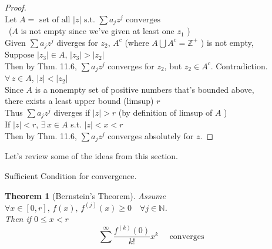 \documentclass[twoside]{amsart}
\theoremstyle{plain}
\newtheorem{theorem}{Theorem}
\theoremstyle{definition}
\begin{document}
\begin{proof} \quad \\
Let $A = \text{ set of all $|z|$ s.t. $\sum a_j z^j$ converges } $ \\
\quad \, ($A$ is not empty since we've given at least one $z_1$ ) \bigskip \\

Given $\sum a_j z^j$ diverges for $z_2$, $A^c$ (where $A \bigcup A^c = \mathbb{Z}^+$ ) is not empty, \medskip \\
\phantom{ Give} Suppose $|z_3| \in A$, \quad $|z_3| > |z_2|$ \\
\phantom{ Given Sup} Then by Thm. 11.6, $\sum a_j z^j$ converges for $z_2$, but $z_2 \in A^c$.  Contradiction.  \medskip \\
  \phantom{ Given Suppose } $\forall \, z \in A$, $|z| < |z_2|$ \bigskip \\

Since $A$ is a nonempty set of positive numbers that's bounded above, \\
\phantom{Sinc} there exists a least upper bound (limsup) $r$ \medskip \\
\phantom{Since th} Thus $\sum a_j z^j$ diverges if $|z| > r$ (by definition of limsup of $A$ ) \bigskip \\

If $|z| < r$, $\exists \, x \in A$ s.t. $|z| < x < r$ \medskip \\
\phantom{ If } Then by Thm. 11.6, $\sum a_j z^j$ converges absolutely for $z$.  
\end{proof}

Let's review some of the ideas from this section.  

Sufficient Condition for convergence.  
\begin{theorem}[Bernstein's Theorem]
Assume $\forall x \in [0,r], \, f(x), \, f^{(j)}(x) \geq 0 \quad \forall j \in \mathbb{N}$.  \\
Then if $0 \leq x < r$
\[
\sum^{\infty} \frac{f^{(k)}(0)}{k! }x^k \quad \text{ converges }
\]
\end{theorem}
\end{document}
